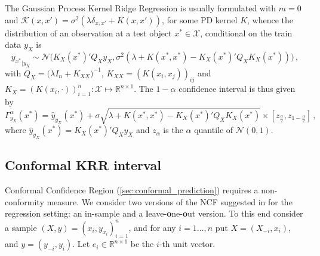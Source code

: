 \documentclass[a4paper,14pt]{article}
\newcommand{\Ncal}{\mathcal{N}}
\newcommand{\Kcal}{\mathcal{K}}
\newcommand{\Xcal}{\mathcal{X}}
\newcommand{\Real}{\mathbb{R}}
\begin{document}
The Gaussian Process Kernel Ridge Regression is usually formulated with $m=0$ and
$\Kcal(x,x') = \sigma^2(\lambda \delta_{x,x'} + K(x,x'))$, for some PD kernel $K$,
whence the distribution of an observation at a test object $x^*\in \Xcal$, conditional
on the train data $y_X$ is
\begin{equation} \label{eq:gp_cond_dist}
{y_{x^*}}_{|y_X}
  \sim \Ncal\bigl(
    K_X(x^*)' Q_X y_X,
    \sigma^2( \lambda + K(x^*, x^*) - K_X(x^*)' Q_X K_X(x^*) )
  \bigr) \,,
\end{equation}
with $Q_X = \bigl(\lambda I_n + K_{XX}\bigr)^{-1}$, $K_{XX} = (K(x_i,x_j))_{ij}$ and
$K_X = (K(x_i, \cdot))_{i=1}^n: \Xcal \mapsto \Real^{n\times1}$. The $1-\alpha$
confidence interval is thus given by
\begin{equation} \label{eq:gp_conf_int}
\Gamma^\alpha_{y_X}(x^*)
  = \hat{y}_{y_X}(x^*)
  + \sigma \sqrt{\lambda + K(x^*, x^*) - K_X(x^*)' Q_X K_X(x^*)}
  \times [z_{\frac{\alpha}{2}}, z_{1-\frac{\alpha}{2}}]
  \,,
\end{equation}
where $\hat{y}_{y_X}(x^*) = K_X(x^*)' Q_X y_X$ and $z_\alpha$ is the $\alpha$ quantile
of $\Ncal(0, 1)$.


\subsection{Conformal KRR interval} %
\label{sub:conformal_krr_interval}

Conformal Confidence Region (\ref{sec:conformal_prediction}) requires a non-conformity
measure. We consider two versions of the NCF suggested in \cite{vovk2005} for the
regression setting: an in-sample and a \textbf{l}eave-\textbf{o}ne-\textbf{o}ut version.
To this end consider a sample $(X, y) = (x_i, y_{x_i})_{i=1}^n$, and for any $i=1\ldots, n$
put $X = (X_{-i}, x_i)$, and $y = (y_{-i}, y_i)$. Let $e_i\in \Real^{n\times 1}$ be
the $i$-th unit vector.
\end{document}
